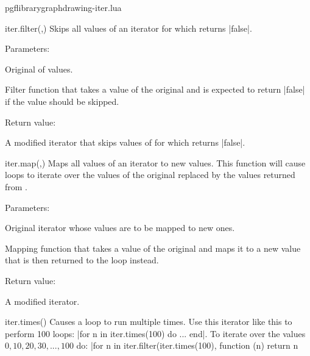 
\begin{filedescription}{pgflibrarygraphdrawing-iter.lua}


\begin{luacommand}{{iter.filter}(,)}
Skips all values of an iterator for which  returns |false|. 

Parameters:
\begin{parameterdescription}
	\item[\meta{iterator}] Original  of values.\item[\meta{filter\_func}] Filter function that takes a value of the original  and is expected to return |false| if the value should be skipped. 
\end{parameterdescription}


Return value:
\begin{parameterdescription} 
  \item[] A modified iterator that skips values of  for which  returns |false|. 
\end{parameterdescription}


\end{luacommand}
\begin{luacommand}{{iter.map}(,)}
Maps all values of an iterator to new values.  This function will cause loops to iterate over the values of the original  replaced by the values returned from . 

Parameters:
\begin{parameterdescription}
	\item[\meta{iterator}] Original iterator whose values are to be mapped to new ones.\item[\meta{map\_func}] Mapping function that takes a value of the original  and maps it to a new value that is then returned to the loop instead. 
\end{parameterdescription}


Return value:
\begin{parameterdescription} 
  \item[] A modified iterator. 
\end{parameterdescription}


\end{luacommand}
\begin{luacommand}{{iter.times}()}
Causes a loop to run multiple times.  Use this iterator like this to perform 100 loops: |for n in iter.times(100) do ... end|.  To iterate over the values $0, 10, 20, 30, ..., 100$ do: |for n in iter.filter(iter.times(100), function (n) return n %


\end{luacommand}
\end{filedescription}
